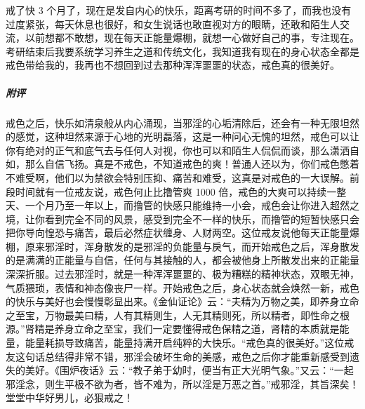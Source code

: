 \begin{case}\label{Xiangdoubuganxiang}
    戒了快 3 个月了，现在是发自内心的快乐，距离考研的时间不多了，而我也没有过度紧张，每天休息也很好，和女生说话也敢直视对方的眼睛，还敢和陌生人交流，以前想都不敢想，现在每天正能量爆棚，就想一心做好自己的事，专注现在。考研结束后我要系统学习养生之道和传统文化，我知道我有现在的身心状态全都是戒色带给我的，我再也不想回到过去那种浑浑噩噩的状态，戒色真的很美好。
    \subparagraph{附评} 戒色之后，快乐如清泉般从内心涌现，当邪淫的心垢清除后，还会有一种无限坦然的感觉，这种坦然来源于心地的光明磊落，这是一种问心无愧的坦然，戒色可以让你有绝对的正气和底气去与任何人对视，你也可以和陌生人侃侃而谈，那么潇洒自如，那么自信飞扬。真是不戒色，不知道戒色的爽！普通人还以为，你们戒色憋着不难受啊，他们以为禁欲会特别压抑、痛苦和难受，这真是对戒色的一大误解。前段时间就有一位戒友说，戒色何止比撸管爽 1000 倍，戒色的大爽可以持续一整天、一个月乃至一年以上，而撸管的快感只能维持一小会，戒色会让你进入超然之境，让你看到完全不同的风景，感受到完全不一样的快乐，而撸管的短暂快感只会把你导向惶恐与痛苦，最后必然症状缠身、人财两空。这位戒友说他每天正能量爆棚，原来邪淫时，浑身散发的是邪淫的负能量与戾气，而开始戒色之后，浑身散发的是满满的正能量与自信，任何与其接触的人，都会被他身上所散发出来的正能量深深折服。过去邪淫时，就是一种浑浑噩噩的、极为糟糕的精神状态，双眼无神，气质猥琐，表情和神态像丧尸一样。开始戒色之后，身心状态就会焕然一新，戒色的快乐与美好也会慢慢彰显出来。《金仙证论》云：“夫精为万物之美，即养身立命之至宝，万物最美曰精，人有其精则生，人无其精则死，所以精者，即性命之根源。”肾精是养身立命之至宝，我们一定要懂得戒色保精之道，肾精的本质就是能量，能量耗损导致痛苦，能量持满开启纯粹的大快乐。“戒色真的很美好。”这位戒友这句话总结得非常不错，邪淫会破坏生命的美感，戒色之后你才能重新感受到遗失的美好。《围炉夜话》云：“教子弟于幼时，便当有正大光明气象。”又云：“一起邪淫念，则生平极不欲为者，皆不难为，所以淫是万恶之首。”戒邪淫，其旨深矣！堂堂中华好男儿，必狠戒之！
\end{case}

